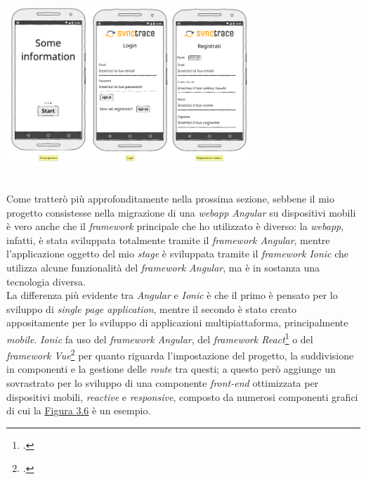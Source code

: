 \begin{minipage}{\linewidth}
  \label{img:appsketch}
  \centering
    \includegraphics[height=6cm]{immagini/appsketch}
\end{minipage} \\

Come tratterò più approfonditamente nella prossima sezione, sebbene il mio progetto consistesse nella migrazione di una \textit{webapp Angular} su dispositivi mobili è vero anche che il \textit{framework} principale che ho utilizzato è diverso: la \textit{webapp}, infatti, è stata sviluppata totalmente tramite il \textit{framework Angular}, mentre l'applicazione oggetto del mio \textit{stage} è sviluppata tramite il \textit{framework Ionic} che utilizza alcune funzionalità del \textit{framework Angular}, ma è in sostanza una tecnologia diversa. \\
La differenza più evidente tra \textit{Angular} e \textit{Ionic} è che il primo è pensato per lo sviluppo di \textit{single page application}, mentre il secondo è stato creato appositamente per lo sviluppo di applicazioni multipiattaforma, principalmente \textit{mobile}. \textit{Ionic} fa uso del \textit{framework Angular}, del \textit{framework React}\footcite{tec:react} o del \textit{framework Vue}\footcite{tec:vue} per quanto riguarda l'impostazione del progetto, la suddivisione in componenti e la gestione delle \textit{route} tra questi; a questo però aggiunge un sovrastrato per lo sviluppo di una componente \textit{front-end} ottimizzata per dispositivi mobili, \textit{reactive} e \textit{responsive}, composto da numerosi componenti grafici di cui la \hyperref[img:ioniclib]{Figura 3.6} è un esempio. \\

